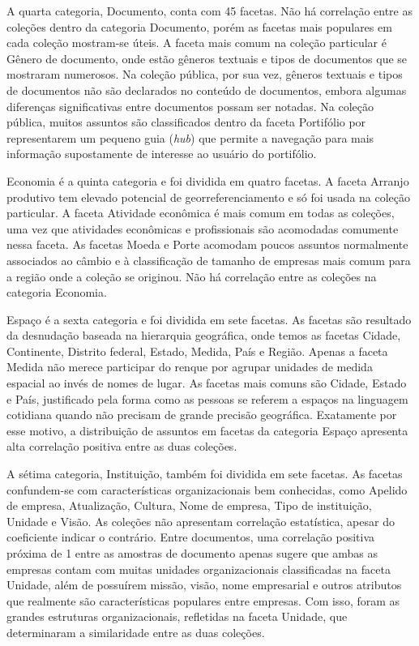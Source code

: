 A quarta categoria, Documento, conta com 45 facetas. Não há correlação entre as coleções dentro da categoria Documento, porém as facetas mais populares em cada coleção mostram-se úteis. A faceta mais comum na coleção particular é Gênero de documento, onde estão gêneros textuais e tipos de documentos que se mostraram numerosos. Na coleção pública, por sua vez, gêneros textuais e tipos de documentos não são declarados no conteúdo de documentos, embora algumas diferenças significativas entre documentos possam ser notadas. Na coleção pública, muitos assuntos são classificados dentro da faceta Portifólio por representarem um pequeno guia (\textit{hub}) que permite a navegação para mais informação supostamente de interesse ao usuário do portifólio.

Economia é a quinta categoria e foi dividida em quatro facetas. A faceta Arranjo produtivo tem elevado potencial de georreferenciamento e só foi usada na coleção particular. A faceta Atividade econômica é mais comum em todas as coleções, uma vez que atividades econômicas e profissionais são acomodadas comumente nessa faceta. As facetas Moeda e Porte acomodam poucos assuntos normalmente associados ao câmbio e à classificação de tamanho de empresas mais comum para a região onde a coleção se originou. Não há correlação entre as coleções na categoria Economia.

Espaço é a sexta categoria e foi dividida em sete facetas. As facetas são resultado da desnudação baseada na hierarquia geográfica, onde temos as facetas Cidade, Continente, Distrito federal, Estado, Medida, País e Região. Apenas a faceta Medida não merece participar do renque por agrupar unidades de medida espacial ao invés de nomes de lugar. As facetas mais comuns são Cidade, Estado e País, justificado pela forma como as pessoas se referem a espaços na linguagem cotidiana quando não precisam de grande precisão geográfica. Exatamente por esse motivo, a distribuição de assuntos em facetas da categoria Espaço apresenta alta correlação positiva entre as duas coleções.

A sétima categoria, Instituição, também foi dividida em sete facetas. As facetas con\-fun\-dem-se com características organizacionais bem conhecidas, como Apelido de empresa, Atualização, Cultura, Nome de empresa, Tipo de instituição, Unidade e Visão. As coleções não apresentam correlação estatística, apesar do coeficiente indicar o contrário. Entre documentos, uma correlação positiva próxima de 1 entre as amostras de documento apenas sugere que ambas as empresas contam com muitas unidades organizacionais classificadas na faceta Unidade, além de possuírem missão, visão, nome empresarial e outros atributos que realmente são características populares entre empresas. Com isso, foram as grandes estruturas organizacionais, refletidas na faceta Unidade, que determinaram a similaridade entre as duas coleções.

